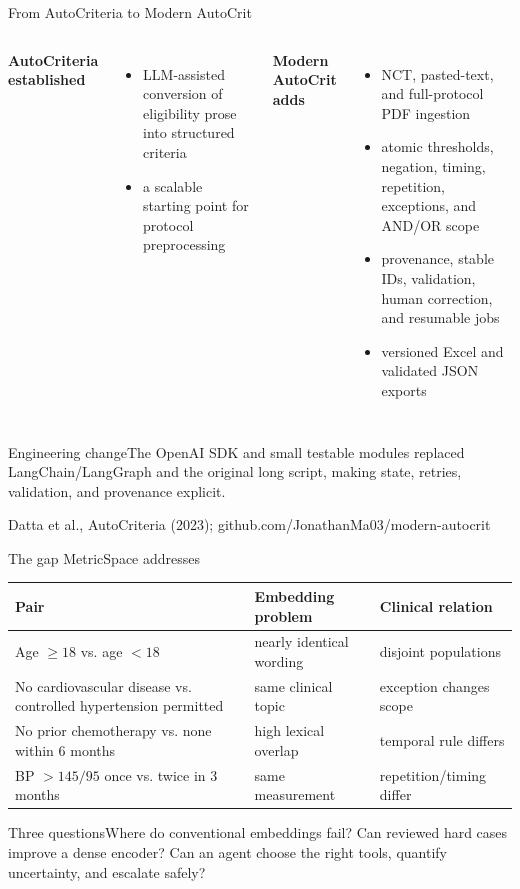 \documentclass[aspectratio=169,10pt]{beamer}
\newcommand{\source}[1]{{\tiny\color{muted}#1}}
\begin{document}
\begin{frame}{From AutoCriteria to Modern AutoCrit}
\begin{columns}[T,onlytextwidth]
\textbf{AutoCriteria established}
\begin{itemize}\item LLM-assisted conversion of eligibility prose into structured criteria\item a scalable starting point for protocol preprocessing\end{itemize}
\textbf{Modern AutoCrit adds}
\begin{itemize}\item NCT, pasted-text, and full-protocol PDF ingestion\item atomic thresholds, negation, timing, repetition, exceptions, and AND/OR scope\item provenance, stable IDs, validation, human correction, and resumable jobs\item versioned Excel and validated JSON exports\end{itemize}
\end{columns}
\begin{block}{Engineering change}The OpenAI SDK and small testable modules replaced LangChain/LangGraph and the original long script, making state, retries, validation, and provenance explicit.\end{block}
\source{Datta et al., AutoCriteria (2023); github.com/JonathanMa03/modern-autocrit}
\end{frame}

\begin{frame}{The gap MetricSpace addresses}
\begin{tabularx}{\textwidth}{@{}X X X@{}}\toprule Pair & Embedding problem & Clinical relation \\\midrule
Age $\geq18$ vs. age $<18$ & nearly identical wording & disjoint populations \\
No cardiovascular disease vs. controlled hypertension permitted & same clinical topic & exception changes scope \\
No prior chemotherapy vs. none within 6 months & high lexical overlap & temporal rule differs \\
BP $>145/95$ once vs. twice in 3 months & same measurement & repetition/timing differ \\\bottomrule\end{tabularx}
\begin{block}{Three questions}Where do conventional embeddings fail? Can reviewed hard cases improve a dense encoder? Can an agent choose the right tools, quantify uncertainty, and escalate safely?\end{block}
\end{frame}
\end{document}
